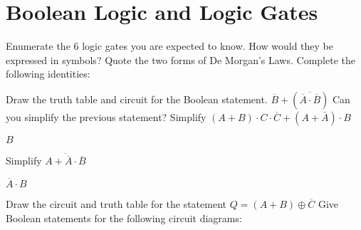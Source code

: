 \section{Boolean Logic and Logic Gates}

\begin{questions}
	\question Enumerate the 6 logic gates you are expected to know. How would they be expressed in symbols? 
	\question Quote the two forms of De Morgan's Laws. 
	\question Complete the following identities:

	\question Draw the truth table and circuit for the Boolean statement.  
			 $\overline{B} + ( \overline{\overline{A} \cdot \overline{B}} )$  
	\question Can you simplify the previous statement? 
	\question Simplify $(A+B)\cdot C \cdot \overline{C} + (A+ \overline{A}) \cdot B$ \begin{solution}$B$\end{solution} 
	\question Simplify $\overline{A+\overline{A} \cdot \overline{B}}$ \begin{solution}$\overline{A}\cdot B$\end{solution}
	\question Draw the circuit and truth table for the statement $Q = (A+B)\oplus \overline{C}$	
	\question Give Boolean statements for the following circuit diagrams:


\end{questions}
